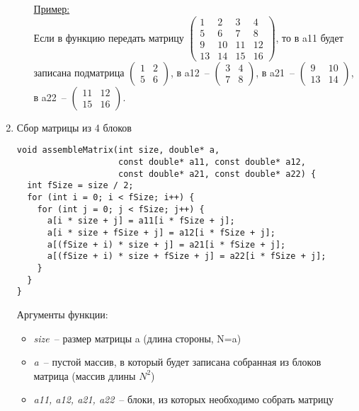 \documentclass{report}
\begin{document}
\begin{enumerate}
\begin{itemize}
\underline{Пример:}\\
Если в функцию передать матрицу $\begin{pmatrix}1 & 2 & 3 & 4 \\ 5 & 6 & 7 & 8 \\ 9 & 10 & 11 & 12 \\ 13 & 14 & 15 & 16\end{pmatrix}$, то в a11 будет записана подматрица $\begin{pmatrix}1 & 2 \\ 5 & 6\end{pmatrix}$, в a12~-- $\begin{pmatrix}3 & 4 \\7 & 8\end{pmatrix}$, в a21~-- $\begin{pmatrix}9 & 10 \\ 13 & 14\end{pmatrix}$, в a22~-- $\begin{pmatrix}11 & 12 \\ 15 & 16\end{pmatrix}$.
\end{itemize}
\item Сбор матрицы из 4 блоков
\begin{lstlisting}
void assembleMatrix(int size, double* a,
                    const double* a11, const double* a12,
                    const double* a21, const double* a22) {
  int fSize = size / 2;
  for (int i = 0; i < fSize; i++) {
    for (int j = 0; j < fSize; j++) {
      a[i * size + j] = a11[i * fSize + j];
      a[i * size + fSize + j] = a12[i * fSize + j];
      a[(fSize + i) * size + j] = a21[i * fSize + j];
      a[(fSize + i) * size + fSize + j] = a22[i * fSize + j];
    }
  }
}
\end{lstlisting}
\par Аргументы функции:
\begin{itemize}
\item \textit{size}~-- размер матрицы a (длина стороны, N=a)
\item \textit{a}~-- пустой массив, в который будет записана собранная из блоков матрица (массив длины $N^2$)
\item \textit{a11, a12, a21, a22}~-- блоки, из которых необходимо собрать матрицу


\end{itemize}
\end{enumerate}
\end{document}
